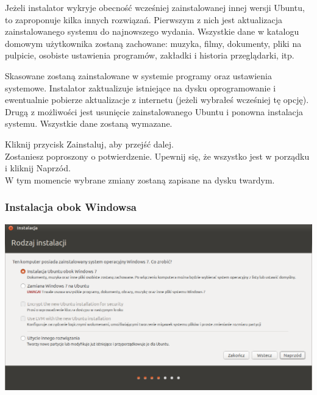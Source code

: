 Jeżeli instalator wykryje obecność wcześniej zainstalowanej innej wersji Ubuntu, to zaproponuje kilka innych rozwiązań.
Pierwszym z nich jest aktualizacja zainstalowanego systemu do najnowszego wydania. Wszystkie dane w katalogu domowym użytkownika zostaną zachowane: muzyka, filmy, dokumenty, pliki na pulpicie, osobiste ustawienia programów, zakładki i historia przeglądarki, itp.

Skasowane zostaną zainstalowane w systemie programy oraz ustawienia systemowe. Instalator zaktualizuje istniejące na dysku oprogramowanie i ewentualnie pobierze aktualizacje z internetu (jeżeli wybrałeś wcześniej tę opcję).
Drugą z możliwości jest usunięcie zainstalowanego Ubuntu i ponowna instalacja systemu. Wszystkie dane zostaną wymazane.
\begin{flushright}
Kliknij przycisk \textcolor{ubuntu_orange}{Zainstaluj}, aby przejść dalej.\\
Zostaniesz poproszony o potwierdzenie. Upewnij się, że wszystko jest w porządku i kliknij \textcolor{ubuntu_orange}{Naprzód}.\\
W tym momencie wybrane zmiany zostaną zapisane na dysku twardym.
\end{flushright}

\subsubsection{Instalacja obok Windowsa}
\begin{center}
        \includegraphics[width=\linewidth]{images/instalator_partycjonowanie_obok_wondows7.png}
\end{center}

